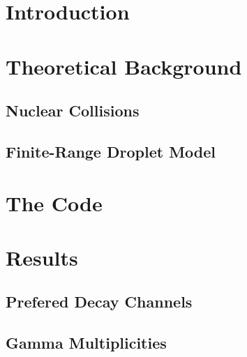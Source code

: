 
\pagestyle{empty}
\tableofcontents
\pagestyle{empty}
\clearpage

\pagestyle{scrheadings}
\ofoot[\pagemark]{\pagemark}
\cfoot[]{}

\setlength{\oddsidemargin}{8pt}
\setlength{\evensidemargin}{23pt}

%

\newpage
{}
\setcounter{page}{1}

\chapter{Introduction}
\label{sec:intro}


\chapter{Theoretical Background}
\label{sec:theory}

\section{Nuclear Collisions}
\label{sec:theory:nuc-col}

\section{Finite-Range Droplet Model}
\label{sec:frdm1995}



\chapter{The Code}
\label{sec:code}


\chapter{Results}
\label{sec:results}
\section{Prefered Decay Channels}


\section{Gamma Multiplicities}


